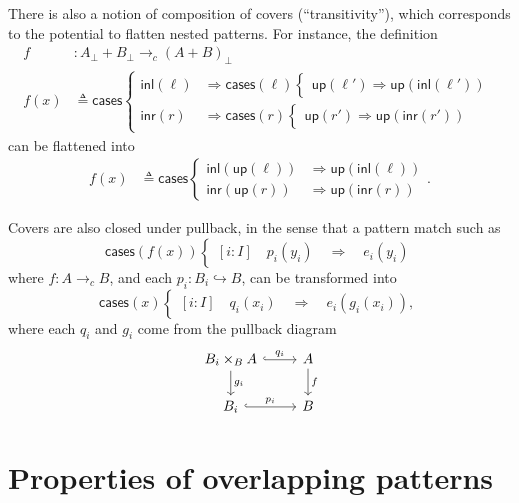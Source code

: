 \documentclass[conference]{IEEEtran}
\newcommand{\hookto}{\hookrightarrow}
\newcommand{\cto}{\to_c}
\newcommand{\Branch}{\Rightarrow}
\newcommand{\up}{\mathsf{up}}
\begin{document}
There is also a notion of composition of covers (``transitivity''), which corresponds to the potential to flatten nested patterns. For instance, the definition
\begin{align*}
f &: A_\bot + B_\bot \cto \left(A + B\right)_\bot
\\ f(x) &\triangleq \mathsf{cases}
\begin{cases}
\mathsf{inl}(\ell) &\Branch \mathsf{cases}(\ell)
  \begin{cases}
  \up(\ell') \Branch \up(\mathsf{inl}(\ell'))
  \end{cases}
\\
\mathsf{inr}(r) &\Branch \mathsf{cases}(r)
  \begin{cases}
  \up(r') \Branch \up(\mathsf{inr}(r'))
  \end{cases}
\end{cases}
\end{align*}
can be flattened into
\begin{align*}
f(x) &\triangleq \mathsf{cases}
\begin{cases}
\mathsf{inl}(\up(\ell)) &\Branch \up(\mathsf{inl}(\ell))
\\
\mathsf{inr}(\up(r)) &\Branch \up(\mathsf{inr}(r))
\end{cases}.
\end{align*}

Covers are also closed under pullback, in the sense that a pattern match such as
\[
\mathsf{cases}(f(x))
\begin{cases}
[i : I] \quad p_i(y_i) \quad \Branch \quad e_i(y_i)
\end{cases}
\]
where $f : A \cto B$, and each $p_i : B_i \hookto B$,
can be transformed into
\[
\mathsf{cases}(x)
\begin{cases}
[i : I] \quad q_i(x_i) \quad \Branch \quad e_i(g_i(x_i)),
\end{cases}
\]
where each $q_i$ and $g_i$ come from the pullback diagram
\begin{equation*}
\begin{tikzcd}
B_i \times_B A \arrow[r, hook, "q_i"]
   \arrow[d, "g_i"]
& A \arrow[d, "f"]
\\ B_i \arrow[r, hook, "p_i"]
& B
\end{tikzcd}
\end{equation*}

\section{Properties of overlapping patterns}
\label{s:properties}
\end{document}
